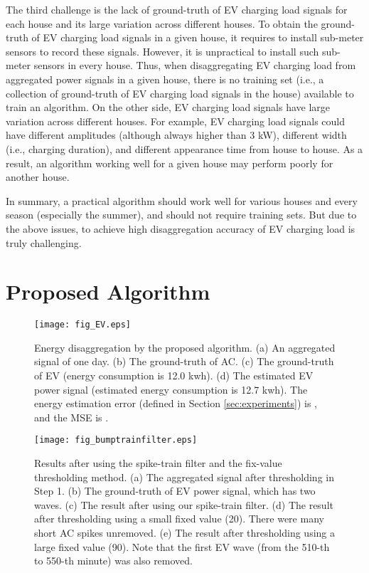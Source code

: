 \documentclass[conference]{IEEEtran}
\begin{document}
The third challenge is the lack of ground-truth of EV charging load signals for each house and  its large variation across different houses. To obtain the ground-truth of EV charging load signals in a given house, it requires to install sub-meter sensors to record these signals. However, it is unpractical to install such sub-meter sensors in every house. Thus, when disaggregating EV charging load from aggregated power signals in a given house, there is no training set (i.e., a collection of ground-truth of EV charging load signals in the house) available to train an algorithm. On the other side, EV charging load signals have large variation across different houses. For example,  EV charging load signals could have different amplitudes (although always higher than 3 kW), different width (i.e., charging duration), and different appearance time from house to house. As a result, an algorithm working well for a given house may perform poorly for another house.

In summary, a practical algorithm should work well for various houses and every season (especially the summer), and should not require training sets. But due to the above issues, to achieve high disaggregation accuracy of EV charging load is truly challenging.





\section{Proposed Algorithm}
\label{sec:EV}




\begin{figure}[t]
\centering
\texttt{[image: fig\_EV.eps]}
\caption{\footnotesize{Energy disaggregation by the proposed algorithm. (a) An aggregated signal of one day. (b) The ground-truth of AC. (c) The ground-truth of EV (energy consumption is 12.0 kwh). (d) The estimated EV power signal (estimated energy consumption is 12.7 kwh). The energy estimation error (defined in Section \ref{sec:experiments}) is , and the MSE is .}}
\label{fig:EVest}
\end{figure}







\begin{figure}[t]
\centering
\texttt{[image: fig\_bumptrainfilter.eps]}
\caption{\footnotesize{Results after using the spike-train filter and the fix-value thresholding method. (a) The aggregated signal after thresholding in Step 1. (b) The ground-truth of EV power signal, which has two waves. (c) The result after using our spike-train filter. (d) The result after thresholding using a small fixed value (20). There were many short AC spikes unremoved. (e) The result after thresholding using a large fixed value (90). Note that the first EV wave (from the 510-th to 550-th minute) was also removed.}}
\label{fig:bumptrainfilter}
\end{figure}
\end{document}
